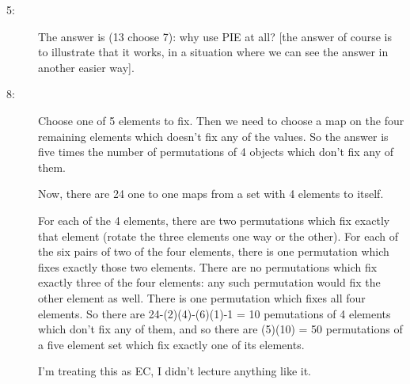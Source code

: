 \documentclass[12pt]{article}
\begin{document}
\begin{description}
\item[5:]  The answer is (13 choose 7):  why use PIE at all?  [the answer of course is to illustrate that it works, in a situation where we can see the answer in another easier way].

\item[8:]  Choose one of 5 elements to fix.  Then we need to choose a map on the four remaining elements which doesn't fix any of the values.  So the answer is five times the number of permutations of 4 objects which don't fix any of them.

Now, there are 24 one to one maps from a set with 4 elements to itself.

For each of the 4 elements, there are two permutations which fix exactly that element (rotate the three elements one way or the other).  For each of the six pairs of two of the four elements, there is one permutation which fixes exactly those two elements.  There are no permutations which fix exactly three of the four elements:  any such permutation would fix the other element as well.  There is one permutation which fixes all four elements.  So there are 24-(2)(4)-(6)(1)-1 = 10 pemutations of 4 elements which don't fix any of them, and so there are (5)(10) = 50 permutations of a five element set which fix exactly one of its elements.

I'm treating this as EC, I didn't lecture anything like it.

\end{description}
\end{document}
